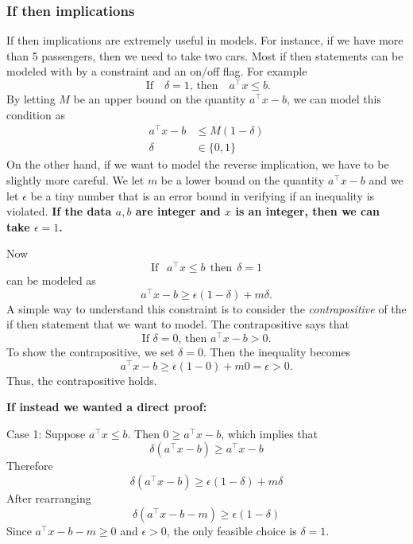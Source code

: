 \documentclass[../open-optimization/open-optimization.tex]{subfiles}
\begin{document}
\subsubsection{If then implications}

If then implications are extremely useful in models.  
For instance, if we have more than 5 passengers, then we need to take two cars.   Most if then statements can be modeled with by a constraint and an on/off flag.  For example
\begin{equation}
\text{ If } \ \ \   \delta = 1 \text{, then  } \ \ \ a^\top x \leq b.
\end{equation}
By letting $M$ be an upper bound on the quantity $a^\top x - b$, we can model this condition as 
\begin{equation}
\begin{split}
a^\top x - b& \leq M(1-\delta)\\
\delta & \in \{0,1\}
\end{split}
\end{equation}
On the other hand, if we want to model the reverse implication, we have to be slightly more careful.  We let $m$ be a lower bound on the quantity $a^\top x - b$ and we let $\epsilon$ be a tiny number that is an error bound in verifying if an inequality is violated.  \textbf{If the data $a,b$ are integer and $x$ is an integer, then we can take $\epsilon = 1$.}

Now
\begin{equation}
\text{If } \ \ a^\top x \leq b  \ \ \text{then}\ \ \delta = 1
\end{equation}
can be modeled as 
\begin{equation}
a^\top x -b  \geq  \epsilon(1-\delta) + m \delta.
\end{equation}
A simple way to understand this constraint is to consider the \emph{contrapositive} of the if then statement that we want to model.  The contrapositive says that 
\begin{equation}
\text{If $\delta = 0$, then $a^\top x - b > 0$.}
\end{equation}
To show the contrapositive, we set $\delta = 0$.  Then the inequality becomes 
$$
a^\top x - b \geq \epsilon(1-0) + m0 = \epsilon > 0.
$$
Thus, the contrapositive holds.

\textbf{If instead we wanted a direct proof:}

Case 1: Suppose $a^\top x \leq b$.  Then $0 \geq a^\top x - b$, which implies that 
$$
\delta(a^\top x - b) \geq a^\top x - b
$$
Therefore
$$
\delta(a^\top x - b) \geq \epsilon(1-\delta) + m \delta
$$
After rearranging
$$
\delta(a^\top x - b - m) \geq \epsilon(1-\delta)
$$
Since $a^\top x - b - m \geq 0$ and $\epsilon > 0$, the only feasible choice is $\delta = 1$.
\end{document}
